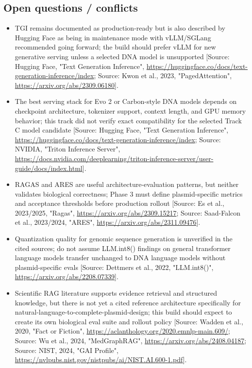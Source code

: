 \documentclass[11pt]{report}
\begin{document}
\subsection{Open questions / conflicts}
\begin{itemize}
\item TGI remains documented as production-ready but is also described by Hugging Face as being in maintenance mode with vLLM/SGLang recommended going forward; the build should prefer vLLM for new generative serving unless a selected DNA model is unsupported [Source: Hugging Face, "Text Generation Inference", \url{https://huggingface.co/docs/text-generation-inference/index}; Source: Kwon et al., 2023, "PagedAttention", \url{https://arxiv.org/abs/2309.06180}].
\item The best serving stack for Evo 2 or Carbon-style DNA models depends on checkpoint architecture, tokenizer support, context length, and GPU memory behavior; this track did not verify exact compatibility for the selected Track C model candidate [Source: Hugging Face, "Text Generation Inference", \url{https://huggingface.co/docs/text-generation-inference/index}; Source: NVIDIA, "Triton Inference Server", \url{https://docs.nvidia.com/deeplearning/triton-inference-server/user-guide/docs/index.html}].
\item RAGAS and ARES are useful architecture-evaluation patterns, but neither validates biological correctness; Phase 3 must define plasmid-specific metrics and acceptance thresholds before production rollout [Source: Es et al., 2023/2025, "Ragas", \url{https://arxiv.org/abs/2309.15217}; Source: Saad-Falcon et al., 2023/2024, "ARES", \url{https://arxiv.org/abs/2311.09476}].
\item Quantization quality for genomic sequence generation is unverified in the cited sources; do not assume LLM.int8() findings on general transformer language models transfer unchanged to DNA language models without plasmid-specific evals [Source: Dettmers et al., 2022, "LLM.int8()", \url{https://arxiv.org/abs/2208.07339}].
\item Scientific RAG literature supports evidence retrieval and structured knowledge, but there is not yet a cited reference architecture specifically for natural-language-to-complete-plasmid-design; this build should expect to create its own biological eval suite and rollout policy [Source: Wadden et al., 2020, "Fact or Fiction", \url{https://aclanthology.org/2020.emnlp-main.609/}; Source: Wu et al., 2024, "MedGraphRAG", \url{https://arxiv.org/abs/2408.04187}; Source: NIST, 2024, "GAI Profile", \url{https://nvlpubs.nist.gov/nistpubs/ai/NIST.AI.600-1.pdf}].
\end{itemize}
\end{document}

